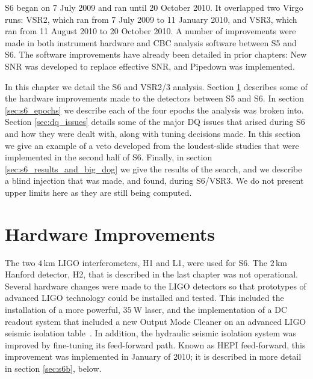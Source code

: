 
\def\firstFAR{\ensuremath{\mathrm{2.2~yr^{-1}}}}
\def\secondFAR{\ensuremath{\mathrm{5.6~yr^{-1}}}}
\def\thirdFAR{\ensuremath{\mathrm{9.4~yr^{-1}}}}
\def\expectedLoudestFAR{\ensuremath{\mathrm{\sim2~yr^{-1}}}}
\def\dogDate{16 September 2010}
\def\injectedDogTime{06:42:23 UTC}
\def\injectedDogGPSTime{968654558.0}

\ac{S6} began on 7 July 2009 and ran until 20 October 2010. It overlapped two Virgo runs: \ac{VSR2}, which ran from 7 July 2009 to 11 January 2010, and \ac{VSR3}, which ran from 11 August 2010 to 20 October 2010. A number of improvements were made in both instrument hardware and \ac{CBC} analysis software between \ac{S5} and \ac{S6}. The software improvements have already been detailed in prior chapters: New \ac{SNR} was developed to replace effective \ac{SNR}, and Pipedown was implemented.

In this chapter we detail the \ac{S6} and VSR2/3 analysis. Section \ref{sec:hardware_improvements} describes some of the hardware improvements made to the detectors between \ac{S5} and \ac{S6}. In section \ref{sec:s6_epochs} we describe each of the four epochs the analysis was broken into. Section \ref{sec:dq_issues} details some of the major \ac{DQ} issues that arised during \ac{S6} and how they were dealt with, along with tuning decisions made. In this section we give an example of a veto developed from the loudest-slide studies that were implemented in the second half of \ac{S6}. Finally, in section \ref{sec:s6_results_and_big_dog} we give the results of the search, and we describe a blind injection that was made, and found, during \ac{S6}/VSR3. We do not present upper limits here as they are still being computed.

\section{Hardware Improvements}
\label{sec:hardware_improvements}

The two $4\,$km \ac{LIGO} interferometers, H1 and L1, were used for \ac{S6}.
The $2\,$km Hanford detector, H2, that is described in the last chapter was not
operational. Several hardware changes were made to the \ac{LIGO} detectors so
that prototypes of advanced LIGO technology could be installed and tested. This
included the installation of a more powerful, $35~\mathrm{W}$ laser, and the
implementation of a DC readout system that included a new Output Mode Cleaner
on an advanced LIGO seismic isolation table~\cite{Adhikari:2006}. In addition,
the hydraulic seismic isolation system was improved by fine-tuning its
feed-forward path. Known as HEPI feed-forward, this improvement was implemented
in January of 2010; it is described in more detail in section \ref{sec:s6b},
below.

